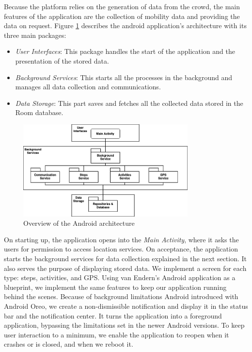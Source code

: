 Because the platform relies on the generation of data from the crowd, the main features of the application are the collection of mobility data and providing the data on request. Figure \ref{fig:modules} describes the android application's architecture with its three main packages:

\begin{itemize}
    \item \textit{User Interfaces}: This package handles the start of the application and the presentation of the stored data.
    \item \textit{Background Services}: This starts all the processes in the background and manages all data collection and communications.
    \item \textit{Data Storage}: This part saves and fetches all the collected data stored in the Room database.
\end{itemize}

\begin{figure}[htpb]
  \centering
  \includegraphics[width=0.8\textwidth]{figures/modules}
  \caption{Overview of the Android architecture} \label{fig:modules}
\end{figure}

On starting up, the application opens into the \textit{Main Activity}, where it asks the users for permission to access location services. On acceptance, the application starts the background services for data collection explained in the next section. It also serves the purpose of displaying stored data. We implement a screen for each type: steps, activities, and GPS. Using van Endern's Android application as a blueprint, we implement the same features to keep our application running behind the scenes. Because of background limitations Android introduced with Android Oreo, we create a non-dismissible notification and display it in the status bar and the notification center. It turns the application into a foreground application, bypassing the limitations set in the newer Android versions. To keep user interaction to a minimum, we enable the application to reopen when it crashes or is closed, and when we reboot it.

